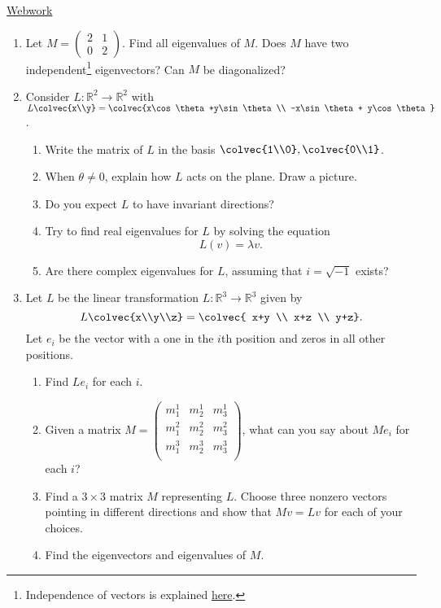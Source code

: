\href{\webworkurl}{Webwork}


\begin{enumerate}
\item Let $M=\begin{pmatrix}
2 & 1 \\
0 & 2
\end{pmatrix}$.  Find all eigenvalues of $M$.  Does $M$ have two independent\footnote{Independence of vectors is  explained \hyperref[independent]{here}.} eigenvectors?  Can $M$ be diagonalized?


\item Consider $L \colon \mathbb{R}^2\rightarrow \mathbb{R}^2$ with $L\colvec{x\\y}
=\colvec{x\cos \theta +y\sin \theta\\ -x\sin \theta + y\cos \theta}$.
\begin{enumerate}
\item Write the matrix of $L$ in the basis $\colvec{1\\0}, \colvec{0\\1}$.

\item When $\theta\neq 0$, explain how $L$ acts on the plane.  Draw a picture.

\item Do you expect $L$ to have invariant directions?

\item Try to find real eigenvalues for $L$ by solving the equation 
\[
L(v)=\lambda v.
\]

\item Are there complex eigenvalues for $L$, assuming that $i=\sqrt{-1}$ exists?
\end{enumerate}


\item Let $L$ be the linear transformation $L \colon \mathbb{R}^3\rightarrow \mathbb{R}^3$ given by 
\[L\colvec{x\\y\\z}=\colvec{ x+y \\  x+z \\ y+z}.\]  
Let $e_i$ be the vector with a one in the $i$th position and zeros in all other positions.
\begin{enumerate}
\item Find $Le_i$ for each $i$.
\item Given a matrix $M=\begin{pmatrix}
m^1_1 & m^1_2 & m^1_3\\
m^2_1 & m^2_2 & m^2_3\\
m^3_1 & m^3_2 & m^3_3\\
\end{pmatrix}$, what can you say about $Me_i$ for each $i$?
\item Find a $3\times 3$ matrix $M$ representing $L$.  Choose three nonzero vectors pointing in different directions and show that $Mv=Lv$ for each of your choices.
\item Find the eigenvectors and eigenvalues of \(M.\)


\end{enumerate}
\end{enumerate}
